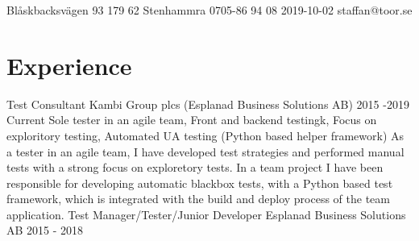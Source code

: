 \documentclass{sobCV}[2017/07/08]
\begin{document}
               {Blåskbacksvägen 93}
               {179 62 Stenhammra}
               {0705-86 94 08}
               {2019-10-02}
               {staffan@toor.se}


   \section{Experience}
      \experiencenode
      {Test Consultant}                %
      {Kambi Group plcs (Esplanad Business Solutions AB)}        %
      {2015 -2019}                        %
      {Current}{                           %
          Sole tester in an agile team,
          Front and backend testingk,
          Focus on exploritory testing,
          Automated UA testing (Python based helper framework)
      }{
          As a tester in an agile team, I have developed test strategies and 
          performed manual tests with a strong focus on exploretory tests. In a
          team project I have been responsible for developing automatic 
          blackbox tests, with a Python based test framework, which is 
          integrated with the build and deploy process of the team application.
      }
      \experiencenode
      {Test Manager/Tester/Junior Developer}         %
      {Esplanad Business Solutions AB}        %
      {2015 - 2018}                        %
\end{document}
